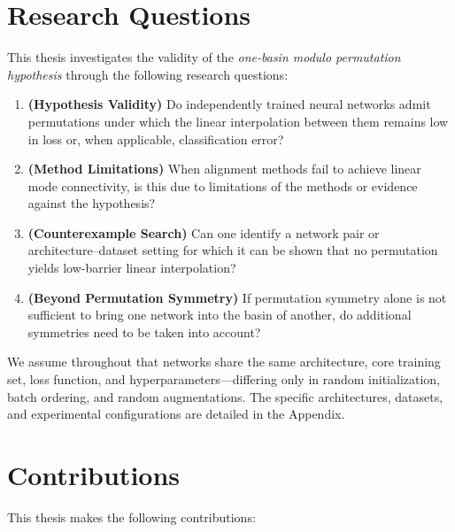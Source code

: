 \documentclass[11pt,a4paper]{report}
\begin{document}
\section{Research Questions}

This thesis investigates the validity of the \textit{one-basin modulo permutation hypothesis} through the following research questions:

\begin{enumerate}  
    \item[\textbf{RQ1}] \textbf{(Hypothesis Validity)} Do independently trained neural networks admit permutations under which the linear interpolation between them remains low in loss or, when applicable, classification error?

    \item[\textbf{RQ2}] \textbf{(Method Limitations)} When alignment methods fail to achieve linear mode connectivity, is this due to limitations of the methods or evidence against the hypothesis?

    \item[\textbf{RQ3}] \textbf{(Counterexample Search)} Can one identify a network pair or architecture--dataset setting for which it can be shown that no permutation yields low-barrier linear interpolation?

    \item[\textbf{RQ4}] \textbf{(Beyond Permutation Symmetry)} If permutation symmetry alone is not sufficient to bring one network into the basin of another, do additional symmetries need to be taken into account?
\end{enumerate}
\noindent We assume throughout that networks share the same architecture, core training set, loss function, and hyperparameters---differing only in random initialization, batch ordering, and random augmentations. The specific architectures, datasets, and experimental configurations are detailed in the Appendix.


\section{Contributions}

This thesis makes the following contributions:
\end{document}
